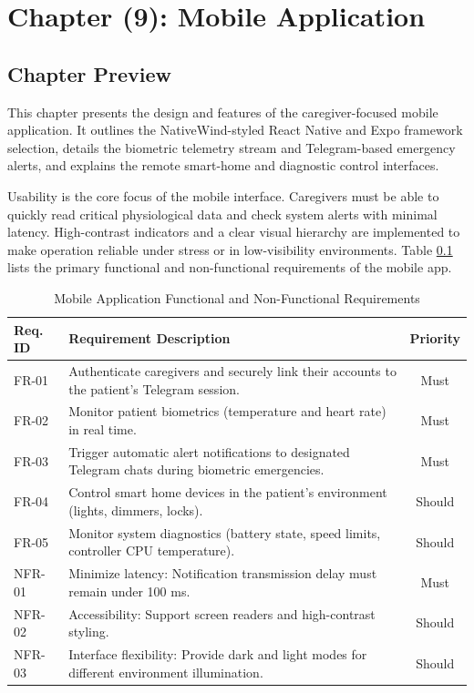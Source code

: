 \setcounter{chapter}{9} 
\chapter*{Chapter (9): Mobile Application}
\renewcommand{\thesection}{\thechapter.\arabic{section}}
\setcounter{section}{0}
\captionsetup[figure]{justification=centering}

\section{Chapter Preview}
This chapter presents the design and features of the caregiver-focused mobile application. It outlines the NativeWind-styled React Native and Expo framework selection, details the biometric telemetry stream and Telegram-based emergency alerts, and explains the remote smart-home and diagnostic control interfaces.

Usability is the core focus of the mobile interface. Caregivers must be able to quickly read critical physiological data and check system alerts with minimal latency. High-contrast indicators and a clear visual hierarchy are implemented to make operation reliable under stress or in low-visibility environments. Table \ref{tab:mobile-requirements} lists the primary functional and non-functional requirements of the mobile app.

\begin{table}[H]
\centering
\caption{Mobile Application Functional and Non-Functional Requirements}
\label{tab:mobile-requirements}
\begin{tabularx}{\textwidth}{|l|>{\raggedright\arraybackslash}X|c|}
\hline
\textbf{Req. ID} & \textbf{Requirement Description} & \textbf{Priority} \\ \hline
FR-01 & Authenticate caregivers and securely link their accounts to the patient's Telegram session. & Must \\ \hline
FR-02 & Monitor patient biometrics (temperature and heart rate) in real time. & Must \\ \hline
FR-03 & Trigger automatic alert notifications to designated Telegram chats during biometric emergencies. & Must \\ \hline
FR-04 & Control smart home devices in the patient's environment (lights, dimmers, locks). & Should \\ \hline
FR-05 & Monitor system diagnostics (battery state, speed limits, controller CPU temperature). & Should \\ \hline
NFR-01 & Minimize latency: Notification transmission delay must remain under 100 ms. & Must \\ \hline
NFR-02 & Accessibility: Support screen readers and high-contrast styling. & Should \\ \hline
NFR-03 & Interface flexibility: Provide dark and light modes for different environment illumination. & Should \\ \hline
\end{tabularx}
\end{table}

